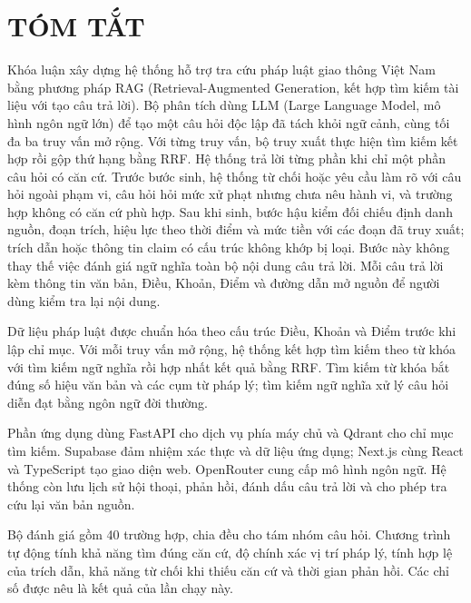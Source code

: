 \documentclass[12pt,a4paper,oneside]{report}
\begin{document}
\chapter*{TÓM TẮT}
Khóa luận xây dựng hệ thống hỗ trợ tra cứu pháp luật giao thông Việt Nam bằng phương pháp RAG (Retrieval-Augmented Generation, kết hợp tìm kiếm tài liệu với tạo câu trả lời). Bộ phân tích dùng LLM (Large Language Model, mô hình ngôn ngữ lớn) để tạo một câu hỏi độc lập đã tách khỏi ngữ cảnh, cùng tối đa ba truy vấn mở rộng. Với từng truy vấn, bộ truy xuất thực hiện tìm kiếm kết hợp rồi gộp thứ hạng bằng RRF. Hệ thống trả lời từng phần khi chỉ một phần câu hỏi có căn cứ. Trước bước sinh, hệ thống từ chối hoặc yêu cầu làm rõ với câu hỏi ngoài phạm vi, câu hỏi hỏi mức xử phạt nhưng chưa nêu hành vi, và trường hợp không có căn cứ phù hợp. Sau khi sinh, bước hậu kiểm đối chiếu định danh nguồn, đoạn trích, hiệu lực theo thời điểm và mức tiền với các đoạn đã truy xuất; trích dẫn hoặc thông tin claim có cấu trúc không khớp bị loại. Bước này không thay thế việc đánh giá ngữ nghĩa toàn bộ nội dung câu trả lời. Mỗi câu trả lời kèm thông tin văn bản, Điều, Khoản, Điểm và đường dẫn mở nguồn để người dùng kiểm tra lại nội dung.

Dữ liệu pháp luật được chuẩn hóa theo cấu trúc Điều, Khoản và Điểm trước khi lập chỉ mục. Với mỗi truy vấn mở rộng, hệ thống kết hợp tìm kiếm theo từ khóa với tìm kiếm ngữ nghĩa rồi hợp nhất kết quả bằng RRF. Tìm kiếm từ khóa bắt đúng số hiệu văn bản và các cụm từ pháp lý; tìm kiếm ngữ nghĩa xử lý câu hỏi diễn đạt bằng ngôn ngữ đời thường.

Phần ứng dụng dùng FastAPI cho dịch vụ phía máy chủ và Qdrant cho chỉ mục tìm kiếm. Supabase đảm nhiệm xác thực và dữ liệu ứng dụng; Next.js cùng React và TypeScript tạo giao diện web. OpenRouter cung cấp mô hình ngôn ngữ. Hệ thống còn lưu lịch sử hội thoại, phản hồi, đánh dấu câu trả lời và cho phép tra cứu lại văn bản nguồn.

Bộ đánh giá gồm 40 trường hợp, chia đều cho tám nhóm câu hỏi. Chương trình tự động tính khả năng tìm đúng căn cứ, độ chính xác vị trí pháp lý, tính hợp lệ của trích dẫn, khả năng từ chối khi thiếu căn cứ và thời gian phản hồi. Các chỉ số được nêu là kết quả của lần chạy này.

\clearpage
\end{document}
